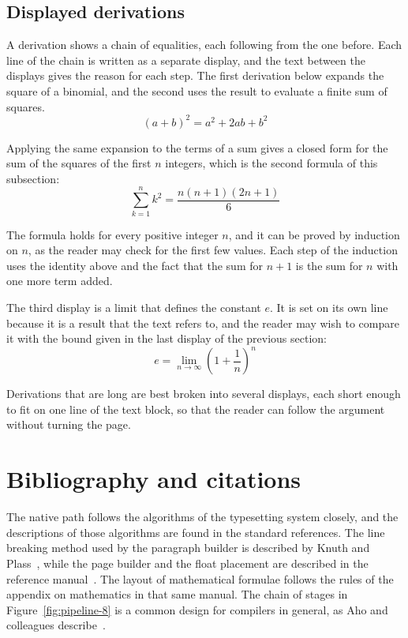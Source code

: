 \documentclass{article}
\begin{document}
\subsection{Displayed derivations}\label{sec:derivations-8}

A derivation shows a chain of equalities, each following from the one before. Each line
of the chain is written as a separate display, and the text between the displays gives
the reason for each step. The first derivation below expands the square of a binomial,
and the second uses the result to evaluate a finite sum of squares.
\[
  (a+b)^{2} = a^{2} + 2ab + b^{2}
\]

Applying the same expansion to the terms of a sum gives a closed form for the sum of the
squares of the first $n$ integers, which is the second formula of this subsection:
\[
  \sum_{k=1}^{n} k^{2} = \frac{n(n+1)(2n+1)}{6}
\]

The formula holds for every positive integer $n$, and it can be proved by induction on
$n$, as the reader may check for the first few values. Each step of the induction
uses the identity above and the fact that the sum for $n+1$ is the sum for $n$ with one
more term added.

The third display is a limit that defines the constant $e$. It is set on its own line
because it is a result that the text refers to, and the reader may wish to compare it
with the bound given in the last display of the previous section:
\[
  e = \lim_{n\to\infty} \left( 1 + \frac{1}{n} \right)^{n}
\]

Derivations that are long are best broken into several displays, each short enough to
fit on one line of the text block, so that the reader can follow the argument without
turning the page.

\section{Bibliography and citations}\label{sec:refs-8}

The native path follows the algorithms of the typesetting system closely, and the
descriptions of those algorithms are found in the standard references. The line
breaking method used by the paragraph builder is described by Knuth and
Plass~\cite{knuth81-8}, while the page builder and the float placement are described in
the reference manual~\cite{knuth86-8}. The layout of mathematical formulae follows the
rules of the appendix on mathematics in that same manual. The chain of stages in
Figure~\ref{fig:pipeline-8} is a common design for compilers in general, as Aho and
colleagues describe~\cite{aho06-8}.
\end{document}
